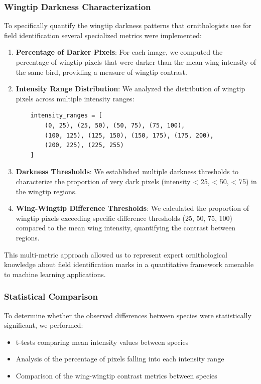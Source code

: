 \documentclass[a4paper,12pt]{report}
\begin{document}
\subsubsection{Wingtip Darkness Characterization}
To specifically quantify the wingtip darkness patterns that ornithologists use for field identification several specialized metrics were implemented:
\begin{enumerate}
    \item \textbf{Percentage of Darker Pixels}: For each image, we computed the percentage of wingtip pixels that were darker than the mean wing intensity of the same bird, providing a measure of wingtip contrast.
    
    \item \textbf{Intensity Range Distribution}: We analyzed the distribution of wingtip pixels across multiple intensity ranges:
    \begin{verbatim}
    intensity_ranges = [
        (0, 25), (25, 50), (50, 75), (75, 100),
        (100, 125), (125, 150), (150, 175), (175, 200),
        (200, 225), (225, 255)
    ]
    \end{verbatim}
    
    \item \textbf{Darkness Thresholds}: We established multiple darkness thresholds to characterize the proportion of very dark pixels (intensity < 25, < 50, < 75) in the wingtip regions.
    
    \item \textbf{Wing-Wingtip Difference Thresholds}: We calculated the proportion of wingtip pixels exceeding specific difference thresholds (25, 50, 75, 100) compared to the mean wing intensity, quantifying the contrast between regions.
\end{enumerate}

This multi-metric approach allowed us to represent expert ornithological knowledge about field identification marks in a quantitative framework amenable to machine learning applications.

\subsubsection{Statistical Comparison}
To determine whether the observed differences between species were statistically significant, we performed:

\begin{itemize}
    \item t-tests comparing mean intensity values between species
    \item Analysis of the percentage of pixels falling into each intensity range
    \item Comparison of the wing-wingtip contrast metrics between species
\end{itemize}
\end{document}
